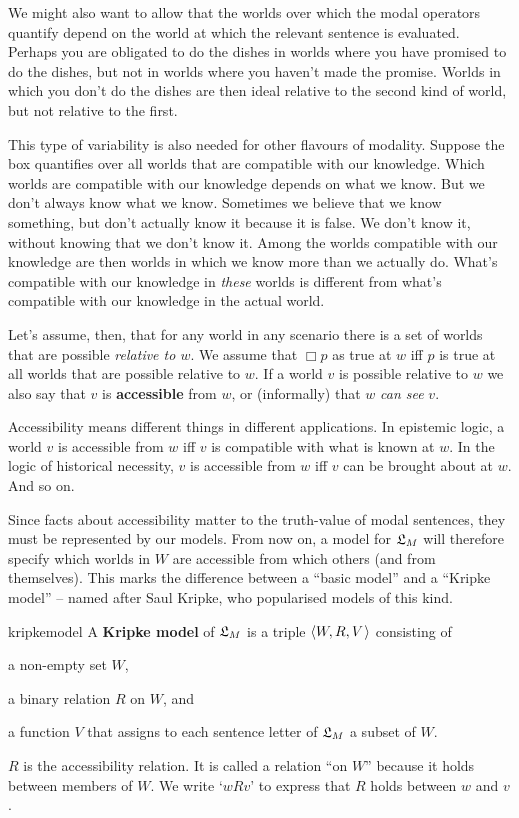 We might also want to allow that the worlds over which the modal operators
quantify depend on the world at which the relevant sentence is evaluated.
Perhaps you are obligated to do the dishes in worlds where you have promised to
do the dishes, but not in worlds where you haven't made the promise. Worlds in
which you don't do the dishes are then ideal relative to the second kind of
world, but not relative to the first.

This type of variability is also needed for other flavours of modality. Suppose
the box quantifies over all worlds that are compatible with our knowledge. Which
worlds are compatible with our knowledge depends on what we know. But we don't
always know what we know. Sometimes we believe that we know something, but don't
actually know it because it is false. We don't know it, without knowing that we
don't know it. \label{par:notB}Among the worlds compatible with our knowledge
are then worlds in which we know more than we actually do. What's compatible
with our knowledge in \emph{these} worlds is different from what's compatible
with our knowledge in the actual world.

Let's assume, then, that for any world in any scenario there is a set of worlds
that are possible \emph{relative to $w$}. We assume that $\Box p$ as true at $w$
iff $p$ is true at all worlds that are possible relative to $w$. If a world $v$
is possible relative to $w$ we also say that $v$ is \textbf{accessible} from $w$,
or (informally) that $w$ \emph{can see} $v$.

Accessibility means different things in different applications. In epistemic
logic, a world $v$ is accessible from $w$ iff $v$ is compatible with what is
known at $w$. In the logic of historical necessity, $v$ is accessible from $w$
iff $v$ can be brought about at $w$. And so on.

Since facts about accessibility matter to the truth-value of modal sentences,
they must be represented by our models. From now on, a model for $\mathfrak{L}_M$ will
therefore specify which worlds in $W$ are accessible from which others (and from
themselves). This marks the difference between a ``basic model'' and a ``Kripke
model'' -- named after Saul Kripke, who popularised models of this kind.
%
% 
\begin{definition}{}{kripkemodel}
  A \textbf{Kripke model} of $\mathfrak{L}_M$ is a triple $\t{W,R,V}$ consisting of
  \vspace{-3mm}
  \begin{itemize*}
  \item a non-empty set $W$,
  \item a binary relation $R$ on $W$, and
  \item a function $V$ that assigns to each sentence letter of $\mathfrak{L}_M$
  a subset of $W$.
  \end{itemize*}
\end{definition}
%
\noindent%
$R$ is the accessibility relation. It is called a relation ``on $W$'' because it
holds between members of $W$. We write `$wRv$' to express that $R$ holds between
$w$ and $v$.

